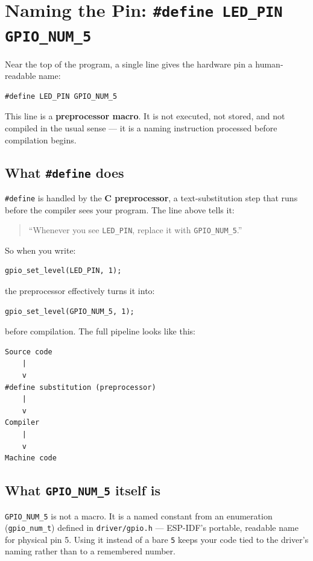\documentclass[11pt]{article}
\begin{document}
\section{Naming the Pin: \texttt{\#define LED\_PIN GPIO\_NUM\_5}}

Near the top of the program, a single line gives the hardware pin a human-readable name:

\begin{verbatim}
#define LED_PIN GPIO_NUM_5
\end{verbatim}

This line is a \textbf{preprocessor macro}. It is not executed, not stored, and not compiled in the usual sense --- it is a naming instruction processed before compilation begins.

\subsection{What \texttt{\#define} does}

\texttt{\#define} is handled by the \textbf{C preprocessor}, a text-substitution step that runs before the compiler sees your program. The line above tells it:

\begin{quote}
``Whenever you see \texttt{LED\_PIN}, replace it with \texttt{GPIO\_NUM\_5}.''
\end{quote}

So when you write:

\begin{verbatim}
gpio_set_level(LED_PIN, 1);
\end{verbatim}

the preprocessor effectively turns it into:

\begin{verbatim}
gpio_set_level(GPIO_NUM_5, 1);
\end{verbatim}

before compilation. The full pipeline looks like this:

\begin{verbatim}
Source code
    |
    v
#define substitution (preprocessor)
    |
    v
Compiler
    |
    v
Machine code
\end{verbatim}

\subsection{What \texttt{GPIO\_NUM\_5} itself is}

\texttt{GPIO\_NUM\_5} is not a macro. It is a named constant from an enumeration (\texttt{gpio\_num\_t}) defined in \texttt{driver/gpio.h} --- ESP-IDF's portable, readable name for physical pin 5. Using it instead of a bare \texttt{5} keeps your code tied to the driver's naming rather than to a remembered number.
\end{document}
